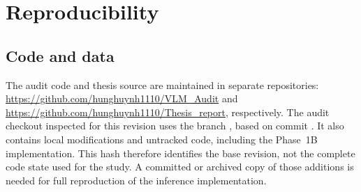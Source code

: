 \chapter{Reproducibility}\label{app:repro}


\section{Code and data}\label{app:repro-code}

\begin{sloppypar}
The audit code and thesis source are maintained in separate repositories:
\url{https://github.com/hunghuynh1110/VLM_Audit} and
\url{https://github.com/hunghuynh1110/Thesis_report}, respectively. The audit
checkout inspected for this revision uses the branch
, based on commit
. It also contains local
modifications and untracked code, including the Phase~1B implementation.
This hash therefore identifies the base revision, not the complete code
state used for the study. A committed or archived copy of those additions
is needed for full reproduction of the inference implementation.
\end{sloppypar}

